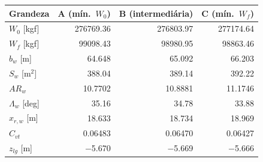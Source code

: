 \begin{tabular}{lrrr}
\toprule
Grandeza & A (mín.\ $W_0$) & B (intermediária) & C (mín.\ $W_f$) \\
\midrule
$W_0$ [kgf] & 276769.36 & 276803.97 & 277174.64 \\
$W_f$ [kgf] & 99098.43 & 98980.95 & 98863.46 \\
$b_w$ [m] & 64.648 & 65.092 & 66.203 \\
$S_w$ [m$^2$] & 388.04 & 389.14 & 392.22 \\
$AR_w$ & 10.7702 & 10.8881 & 11.1746 \\
$\Lambda_w$ [deg] & 35.16 & 34.78 & 33.88 \\
$x_{r,w}$ [m] & 18.633 & 18.734 & 18.969 \\
$C_{vt}$ & 0.06483 & 0.06470 & 0.06427 \\
$z_{lg}$ [m] & $-$5.670 & $-$5.669 & $-$5.666 \\
\bottomrule
\end{tabular}